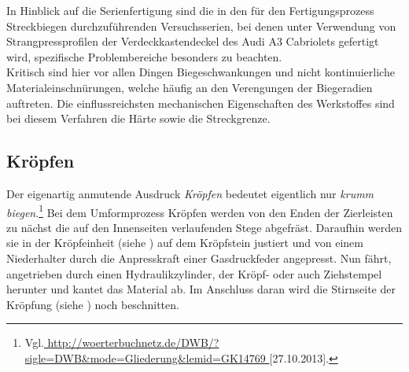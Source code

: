 \documentclass[12pt,a4paper,parskip]{scrartcl}
\begin{document}
In Hinblick auf die Serienfertigung sind die in den für den Fertigungsprozess  Streckbiegen durchzuführenden Versuchsserien, bei denen unter Verwendung von Strangpressprofilen der Verdeckkastendeckel des Audi A3 Cabriolets gefertigt wird, spezifische Problembereiche besonders zu beachten.\\
Kritisch sind hier vor allen Dingen Biegeschwankungen und nicht kontinuierliche Materialeinschnürungen,  welche häufig an den Verengungen der Biegeradien auftreten. Die einflussreichsten mechanischen Eigenschaften des Werkstoffes sind bei diesem Verfahren die Härte sowie die Streckgrenze.



\subsection{Kröpfen \label{sec:kropf}}
Der eigenartig anmutende Ausdruck \emph{Kröpfen} bedeutet eigentlich nur \emph{krumm biegen}.\footnote{Vgl.\url{
http://woerterbuchnetz.de/DWB/?sigle=DWB&mode=Gliederung&lemid=GK14769
}[27.10.2013].}
Bei dem Umformprozess Kröpfen werden von den  Enden der Zierleisten zu nächst die auf den Innenseiten verlaufenden Stege  abgefräst.  Daraufhin werden sie in der Kröpfeinheit (siehe ) auf dem Kröpfstein justiert und von einem Niederhalter durch die Anpresskraft einer Gasdruckfeder angepresst. Nun fährt, angetrieben durch einen Hydraulikzylinder, der Kröpf- oder auch Ziehstempel herunter und kantet das Material ab. Im Anschluss daran wird die Stirnseite der Kröpfung (siehe ) noch beschnitten.
\end{document}
